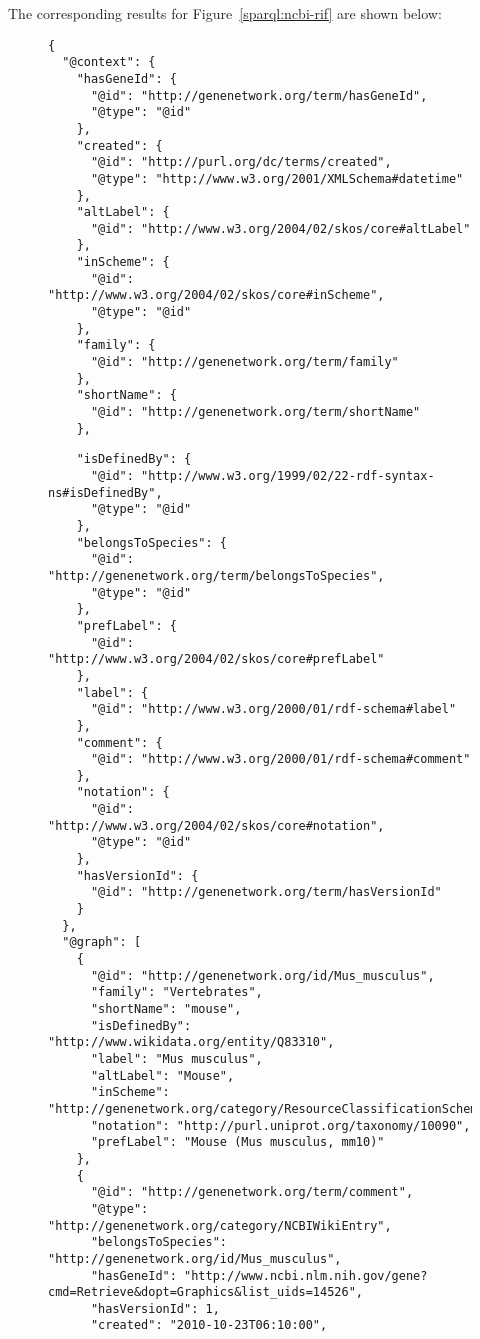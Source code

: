 The corresponding results for Figure~\ref{sparql:ncbi-rif} are shown below:

\begin{figure}[H]
\centering
\begin{verbatim}
{
  "@context": {
    "hasGeneId": {
      "@id": "http://genenetwork.org/term/hasGeneId",
      "@type": "@id"
    },
    "created": {
      "@id": "http://purl.org/dc/terms/created",
      "@type": "http://www.w3.org/2001/XMLSchema#datetime"
    },
    "altLabel": {
      "@id": "http://www.w3.org/2004/02/skos/core#altLabel"
    },
    "inScheme": {
      "@id": "http://www.w3.org/2004/02/skos/core#inScheme",
      "@type": "@id"
    },
    "family": {
      "@id": "http://genenetwork.org/term/family"
    },
    "shortName": {
      "@id": "http://genenetwork.org/term/shortName"
    },
\end{verbatim}
\end{figure}

\begin{figure}[H]
\centering
\begin{verbatim}
    "isDefinedBy": {
      "@id": "http://www.w3.org/1999/02/22-rdf-syntax-ns#isDefinedBy",
      "@type": "@id"
    },
    "belongsToSpecies": {
      "@id": "http://genenetwork.org/term/belongsToSpecies",
      "@type": "@id"
    },
    "prefLabel": {
      "@id": "http://www.w3.org/2004/02/skos/core#prefLabel"
    },
    "label": {
      "@id": "http://www.w3.org/2000/01/rdf-schema#label"
    },
    "comment": {
      "@id": "http://www.w3.org/2000/01/rdf-schema#comment"
    },
    "notation": {
      "@id": "http://www.w3.org/2004/02/skos/core#notation",
      "@type": "@id"
    },
    "hasVersionId": {
      "@id": "http://genenetwork.org/term/hasVersionId"
    }
  },
  "@graph": [
    {
      "@id": "http://genenetwork.org/id/Mus_musculus",
      "family": "Vertebrates",
      "shortName": "mouse",
      "isDefinedBy": "http://www.wikidata.org/entity/Q83310",
      "label": "Mus musculus",
      "altLabel": "Mouse",
      "inScheme": "http://genenetwork.org/category/ResourceClassificationScheme",
      "notation": "http://purl.uniprot.org/taxonomy/10090",
      "prefLabel": "Mouse (Mus musculus, mm10)"
    },
    {
      "@id": "http://genenetwork.org/term/comment",
      "@type": "http://genenetwork.org/category/NCBIWikiEntry",
      "belongsToSpecies": "http://genenetwork.org/id/Mus_musculus",
      "hasGeneId": "http://www.ncbi.nlm.nih.gov/gene?cmd=Retrieve&dopt=Graphics&list_uids=14526",
      "hasVersionId": 1,
      "created": "2010-10-23T06:10:00",
\end{verbatim}
\end{figure}

